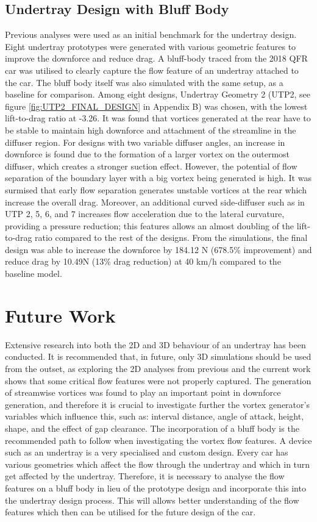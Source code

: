 \subsection{Undertray Design with Bluff Body}
Previous analyses were used as an initial benchmark for the undertray design. Eight undertray prototypes were generated with various geometric features to improve the downforce and reduce drag. A bluff-body traced from the 2018 QFR car was utilised to clearly capture the flow feature of an undertray attached to the car. The bluff body itself was also simulated with the same setup, as a baseline for comparison. Among eight designs, Undertray Geometry 2 (UTP2, see figure \ref{fig:UTP2_FINAL_DESIGN} in Appendix B) was chosen, with the lowest lift-to-drag ratio at -3.26. It was found that vortices generated at the rear have to be stable to maintain high downforce and attachment of the streamline in the diffuser region. For designs with two variable diffuser angles, an increase in downforce is found due to the formation of a larger vortex on the outermost diffuser, which creates a stronger suction effect. However, the potential of flow separation of the boundary layer with a big vortex being generated is high. It was surmised that early flow separation generates unstable vortices at the rear which increase the overall drag. Moreover, an additional curved side-diffuser such as in UTP 2, 5, 6, and 7 increases flow acceleration due to the lateral curvature, providing a pressure reduction; this features allows an almost doubling of the lift-to-drag ratio compared to the rest of the designs. From the simulations, the final design was able to increase the downforce by 184.12 N (678.5\% improvement) and reduce drag by 10.49N (13\% drag reduction) at 40 km/h compared to the baseline model.


\section{Future Work}
\noindent Extensive research into both the 2D and 3D behaviour of an undertray has been conducted. It is recommended that, in future, only 3D simulations should be used from the outset, as exploring the 2D analyses from previous and the current work shows that some critical flow features were not properly captured. The generation of streamwise vortices was found to play an important point in downforce generation, and therefore it is crucial to investigate further the vortex generator's variables which influence this, such as: interval distance, angle of attack, height, shape, and the effect of gap clearance. The incorporation of a bluff body is the recommended path to follow when investigating the vortex flow features. A device such as an undertray is a very specialised and custom design. Every car has various geometries which affect the flow through the undertray and which in turn get affected by the undertray. Therefore, it is necessary to analyse the flow features on a bluff body in lieu of the prototype design and incorporate this into the undertray design process. This will allows better understanding of the flow features which then can be utilised for the future design of the car.

